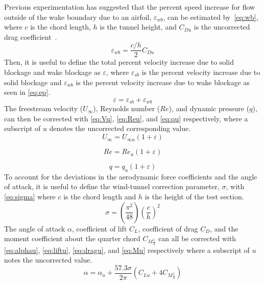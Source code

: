 \documentclass[journal,letterpaper]{IEEEtran}
\begin{document}
Previous experimentation has suggested that the percent speed increase for flow outside of the wake boundary due to an airfoil, $\varepsilon_{wb}$, can be estimated by~\eqref{eq:wb}, where $c$ is the chord length, $h$ is the tunnel height, and $C_{Du}$ is the uncorrected drag coefficient~\cite{lab5r1}.
\begin{equation} \label{eq:wb}
    \varepsilon_{wb} = \frac{c/h}{2}C_{Du}
\end{equation}
Then, it is useful to define the total percent velocity increase due to solid blockage and wake blockage as $\varepsilon$, where $\varepsilon_{sb}$ is the percent velocity increase due to solid blockage and $\varepsilon_{wb}$ is the percent velocity increase due to wake blockage as seen in \eqref{eq:ep}.
\begin{equation} \label{eq:ep}
    \varepsilon = \varepsilon_{sb} + \varepsilon_{wb}
\end{equation}
The freestream velocity ($U_\infty$), Reynolds number ($Re$), and dynamic pressure ($q$), can then be corrected with \eqref{eq:Vu}, \eqref{eq:Reu}, and \eqref{eq:qu} respectively, where a subscript of $u$ denotes the uncorrected corresponding value.
\begin{equation} \label{eq:Vu}
    U_\infty = U_{\infty u}(1 + \varepsilon)
\end{equation}

\begin{equation} \label{eq:Reu}
    Re = Re_u(1 + \varepsilon)
\end{equation}

\begin{equation} \label{eq:qu}
    q = q_u(1 + \varepsilon)
\end{equation}
To account for the deviations in the aerodynamic force coefficients and the angle of attack, it is useful to define the wind-tunnel correction parameter, $\sigma$, with \eqref{eq:sigma} where $c$ is the chord length and $h$ is the height of the test section.
\begin{equation} \label{eq:sigma}
    \sigma = \left(\frac{\pi^2}{48}\right)\left(\frac{c}{h}\right)^2
\end{equation}
The angle of attack $\alpha$, coefficient of lift $C_L$, coefficient of drag $C_D$, and the moment coefficient about the quarter chord $C_{M\frac{1}{4}}$ can all be corrected with \eqref{eq:alphau}, \eqref{eq:liftu}, \eqref{eq:dragu}, and \eqref{eq:Mu} respectively where a subscript of $u$ notes the uncorrected value.
\begin{equation} \label{eq:alphau}
    \alpha = \alpha_u + \frac{57.3\sigma}{2\pi} \left(C_{Lu} + 4C_{M\frac{1}{4}}\right)
\end{equation}
\end{document}
